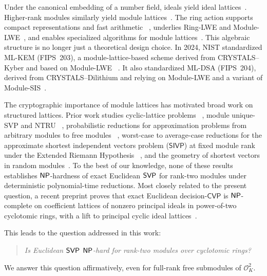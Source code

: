 Under the canonical embedding of a number field, ideals yield
ideal lattices~\cite{lyubashevsky2013ideal}.  Higher-rank modules similarly
yield module lattices~\cite{LangloisStehle15,FelderhoffPelletMaryStehle22}.
The ring action supports compact representations and fast arithmetic
~\cite{HoffsteinPipherSilverman98,LyubashevskyPeikertRegev13}, underlies Ring-LWE
and Module-LWE~\cite{lyubashevsky2013ideal,LangloisStehle15}, and enables
specialized algorithms for module lattices~\cite{LeePelletMaryStehleWallet19}.
This algebraic structure is no longer just a theoretical design choice.  In
2024, NIST standardized ML-KEM (FIPS~203), a module-lattice-based scheme
derived from CRYSTALS--Kyber and based on Module-LWE
~\cite{BosDucasKiltzEtAl18,NISTFIPS203}.  It also standardized ML-DSA
(FIPS~204), derived from CRYSTALS--Dilithium and relying on Module-LWE and a
variant of Module-SIS~\cite{DucasKiltzLepointEtAl18,NISTFIPS204}.

The cryptographic importance of module lattices has motivated broad
work on structured lattices.  Prior work
studies cyclic-lattice problems
~\cite{Micciancio07}, module unique-SVP and NTRU
~\cite{FelderhoffPelletMaryStehle22}, probabilistic reductions for
approximation problems from arbitrary modules to free modules
~\cite{DeMicheliMicciancioPelletMaryTran23}, worst-case to average-case
reductions for the approximate shortest independent vectors problem
($\mathsf{SIVP}$) at fixed module rank under the
Extended Riemann Hypothesis
~\cite{deBoerPageTomaWesolowski26}, and the geometry of shortest vectors in
random modules~\cite{GargavaSerbanViazovskaViglino25}.  To the best
of our knowledge, none of these results establishes $\mathsf{NP}$-hardness of exact
Euclidean $\mathsf{SVP}$ for rank-two modules under
deterministic polynomial-time reductions.  Most closely related to
the present question, a recent preprint proves that exact Euclidean
decision-$\mathsf{CVP}$ is $\mathsf{NP}$-complete on coefficient lattices of nonzero
principal ideals in power-of-two cyclotomic rings, with a lift to principal
cyclic ideal lattices~\cite{LiuFengPan26}.

\enlargethispage{\baselineskip}
\begin{samepage}
This leads to the question addressed in this work:
\begin{quote}
\emph{Is Euclidean $\mathsf{SVP}$ $\mathsf{NP}$-hard for rank-two modules
over cyclotomic rings?}
\end{quote}
 We answer this question affirmatively, even for full-rank free
 submodules of $\mathcal{O}_K^2$.
\end{samepage}

